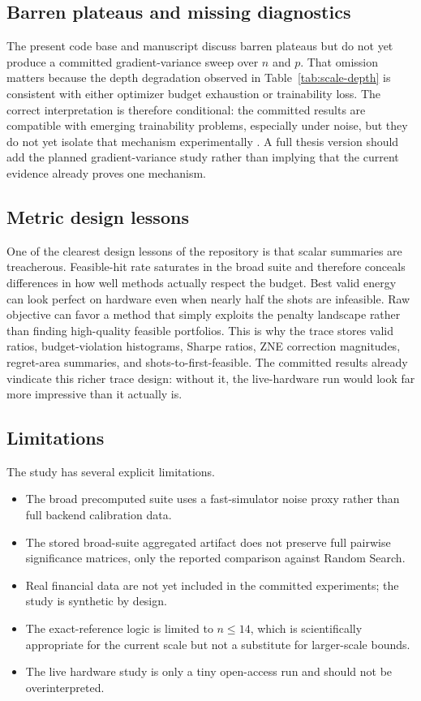 \documentclass[11pt]{article}
\begin{document}
\subsection{Barren plateaus and missing diagnostics}

The present code base and manuscript discuss barren plateaus but do not yet produce a committed gradient-variance sweep over \(n\) and \(p\). That omission matters because the depth degradation observed in Table~\ref{tab:scale-depth} is consistent with either optimizer budget exhaustion or trainability loss. The correct interpretation is therefore conditional: the committed results are compatible with emerging trainability problems, especially under noise, but they do not yet isolate that mechanism experimentally \cite{mcclean2018barren,wang2021noisebarren}. A full thesis version should add the planned gradient-variance study rather than implying that the current evidence already proves one mechanism.

\subsection{Metric design lessons}

One of the clearest design lessons of the repository is that scalar summaries are treacherous. Feasible-hit rate saturates in the broad suite and therefore conceals differences in how well methods actually respect the budget. Best valid energy can look perfect on hardware even when nearly half the shots are infeasible. Raw objective can favor a method that simply exploits the penalty landscape rather than finding high-quality feasible portfolios. This is why the trace stores valid ratios, budget-violation histograms, Sharpe ratios, ZNE correction magnitudes, regret-area summaries, and shots-to-first-feasible. The committed results already vindicate this richer trace design: without it, the live-hardware run would look far more impressive than it actually is.

\subsection{Limitations}

The study has several explicit limitations.
\begin{itemize}[leftmargin=1.5em]
\item The broad precomputed suite uses a fast-simulator noise proxy rather than full backend calibration data.
\item The stored broad-suite aggregated artifact does not preserve full pairwise significance matrices, only the reported comparison against Random Search.
\item Real financial data are not yet included in the committed experiments; the study is synthetic by design.
\item The exact-reference logic is limited to \(n \leq 14\), which is scientifically appropriate for the current scale but not a substitute for larger-scale bounds.
\item The live hardware study is only a tiny open-access run and should not be overinterpreted.
\end{itemize}
\end{document}
